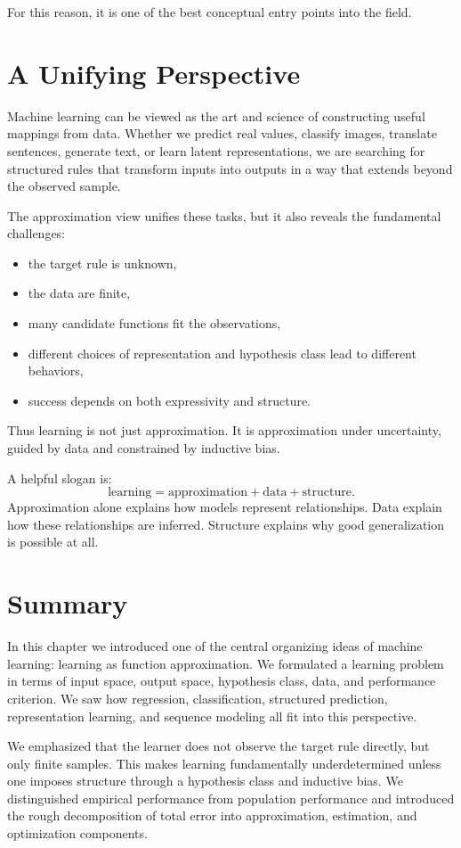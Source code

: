 For this reason, it is one of the best conceptual entry points into the field.

\section{A Unifying Perspective}

Machine learning can be viewed as the art and science of constructing useful mappings from data. Whether we predict real values, classify images, translate sentences, generate text, or learn latent representations, we are searching for structured rules that transform inputs into outputs in a way that extends beyond the observed sample.

The approximation view unifies these tasks, but it also reveals the fundamental challenges:
\begin{itemize}
    \item the target rule is unknown,
    \item the data are finite,
    \item many candidate functions fit the observations,
    \item different choices of representation and hypothesis class lead to different behaviors,
    \item success depends on both expressivity and structure.
\end{itemize}

Thus learning is not just approximation. It is approximation under uncertainty, guided by data and constrained by inductive bias.

A helpful slogan is:
\[
\text{learning} = \text{approximation} + \text{data} + \text{structure}.
\]
Approximation alone explains how models represent relationships. Data explain how these relationships are inferred. Structure explains why good generalization is possible at all.

\section{Summary}

In this chapter we introduced one of the central organizing ideas of machine learning: learning as function approximation. We formulated a learning problem in terms of input space, output space, hypothesis class, data, and performance criterion. We saw how regression, classification, structured prediction, representation learning, and sequence modeling all fit into this perspective.

We emphasized that the learner does not observe the target rule directly, but only finite samples. This makes learning fundamentally underdetermined unless one imposes structure through a hypothesis class and inductive bias. We distinguished empirical performance from population performance and introduced the rough decomposition of total error into approximation, estimation, and optimization components.

